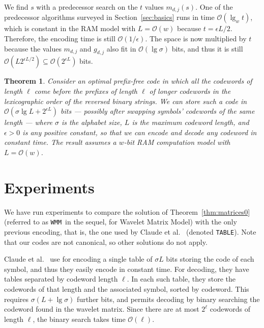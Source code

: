 \documentclass[preprint,12pt]{elsarticle}
\newcommand{\Oh}[1]{\ensuremath{\mathcal{O}\!\left({#1}\right)}}
\newcommand{\wmm}{\texttt{WMM}}
\newcommand{\tablen}{\texttt{TABLE}}
\renewcommand{\log}{\lg}
\newtheorem{theorem}{Theorem}
\begin{document}
We find $s$ with a predecessor search on the $t$ values $m_{d,j}(s)$.
One of the predecessor algorithms surveyed in Section~\ref{sec:basics} runs 
in time $\Oh{\log_w t}$, which is constant in the RAM model with $L = \Oh{w}$
because $t=\epsilon L/2$. Therefore, the encoding time is still 
$\Oh{1/\epsilon}$. The space is now multiplied by $t$ because the
values $m_{d,j}$ and $g_{d,j}$ also fit in $\Oh{\log\sigma}$ bits, and thus
it is still $\Oh{L 2^{\epsilon L/2}} \subseteq \Oh{2^{\epsilon L}}$ bits.

\begin{theorem}
\label{thm:matrices}
Consider an optimal prefix-free code in which all the codewords of length 
$\ell$ come before the prefixes of length $\ell$ of longer codewords in the 
lexicographic order of the reversed binary strings.
We can store such a code in $\Oh{\sigma \log L + 2^{\epsilon L}}$ bits --- possibly after swapping symbols' codewords of the same length --- where $\sigma$ is the alphabet size, $L$ is the maximum codeword length, and $\epsilon>0$ is any positive constant, so that we can encode and decode any codeword in constant time.
The result assumes a $w$-bit RAM computation model with $L=\Oh{w}$.
\end{theorem}


\section{Experiments} \label{sec:exp}

\newcommand{\EsWiki}{\texttt{EsWiki}}
\newcommand{\EsInv}{\texttt{EsInv}}
\newcommand{\Indo}{\texttt{Indo}}
\newcommand{\ESInvD}{\texttt{ESInvD}}
\newcommand{\HH}{\mathcal{H}}
\newcommand{\LL}{\mathcal{L}}

We have run experiments to compare the solution of Theorem~\ref{thm:matrices0}
(referred to as \wmm\ in the sequel, for Wavelet Matrix Model) with the only
previous encoding, that is,
the one used by Claude et al.~\cite{CNO15} (denoted \tablen). Note that
our codes are not canonical, so other solutions \cite{GNNO15} do not apply.

Claude et al.~\cite{CNO15} use for encoding a single table of $\sigma L$ bits
storing the code of each symbol, and thus they easily encode in constant time.
For decoding, they have tables separated by codeword length $\ell$. In each such
table, they store the codewords of that length and the associated symbol,
sorted by codeword. This requires $\sigma (L+\lg\sigma)$ further bits, and
permits decoding by binary searching the codeword found in the wavelet matrix.
Since there are at most $2^\ell$ codewords of length $\ell$, the binary search
takes time $\Oh{\ell}$.
\end{document}

